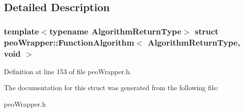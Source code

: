\subsection{Detailed Description}
\subsubsection*{template$<$typename Algorithm\-Return\-Type$>$ struct peo\-Wrapper::Function\-Algorithm$<$ Algorithm\-Return\-Type, void $>$}





Definition at line 153 of file peo\-Wrapper.h.

The documentation for this struct was generated from the following file:\begin{CompactItemize}
\item 
peo\-Wrapper.h\end{CompactItemize}
